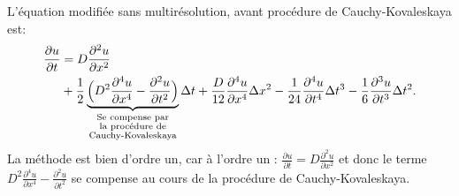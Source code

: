 L'équation modifiée sans multirésolution, avant procédure de Cauchy-Kovaleskaya est:
\begin{align}
    \frac{\partial u}{\partial t}  &= D \frac{\partial^{2} u}{\partial x^{2}} \\\notag
        &+ \frac{1}{2} \underbrace{\Bigl(D^{2}\frac{\partial^{4} u}{\partial x^{4}} - \frac{\partial^{2} u}{\partial t^{2}} \Bigr)}_{\substack{\text{Se compense par} \\ \text{la procédure de} \\ \text{Cauchy-Kovaleskaya}}} \Delta t
        + \frac{D}{12} \frac{\partial^{4} u}{\partial x^{4}}  \Delta x^{2}
        - \frac{1}{24} \frac{\partial^{4} u}{\partial t^{4}}  \Delta t^{3} 
        - \frac{1}{6}  \frac{\partial^{3} u}{\partial t^{3}}  \Delta t^{2}.
\end{align}
La méthode est bien d'ordre un, car à l'ordre un : $\frac{\partial u}{\partial t}  = D \frac{\partial^{2} u}{\partial x^{2}}$ et donc le terme $D^{2}\frac{\partial^{4} u}{\partial x^{4}} - \frac{\partial^{2} u}{\partial t^{2}}$
se compense au cours de la procédure de Cauchy-Kovaleskaya.